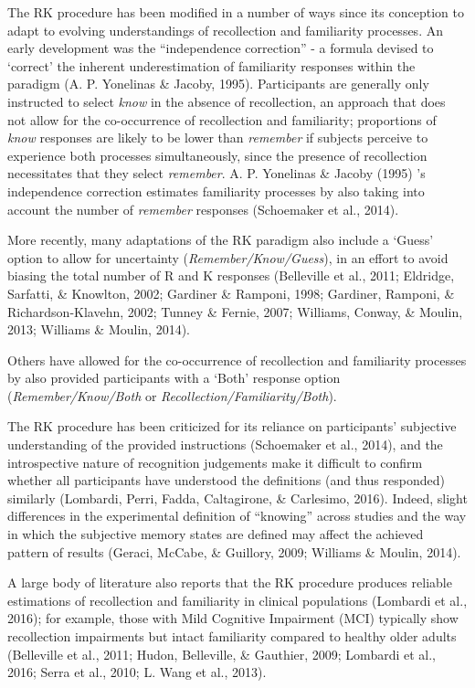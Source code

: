 \documentclass[
  11pt,
]{article}
\begin{document}
The RK procedure has been modified in a number of ways since its
conception to adapt to evolving understandings of recollection and
familiarity processes. An early development was the ``independence
correction'' - a formula devised to `correct' the inherent
underestimation of familiarity responses within the paradigm (A. P.
Yonelinas \& Jacoby, 1995). Participants are generally only instructed
to select \emph{know} in the absence of recollection, an approach that
does not allow for the co-occurrence of recollection and familiarity;
proportions of \emph{know} responses are likely to be lower than
\emph{remember} if subjects perceive to experience both processes
simultaneously, since the presence of recollection necessitates that
they select \emph{remember}. A. P. Yonelinas \& Jacoby (1995) 's
independence correction estimates familiarity processes by also taking
into account the number of \emph{remember} responses (Schoemaker et al.,
2014).

More recently, many adaptations of the RK paradigm also include a
`Guess' option to allow for uncertainty (\emph{Remember/Know/Guess}), in
an effort to avoid biasing the total number of R and K responses
(Belleville et al., 2011; Eldridge, Sarfatti, \& Knowlton, 2002;
Gardiner \& Ramponi, 1998; Gardiner, Ramponi, \& Richardson-Klavehn,
2002; Tunney \& Fernie, 2007; Williams, Conway, \& Moulin, 2013;
Williams \& Moulin, 2014).

Others have allowed for the co-occurrence of recollection and
familiarity processes by also provided participants with a `Both'
response option (\emph{Remember/Know/Both} or
\emph{Recollection/Familiarity/Both}).

The RK procedure has been criticized for its reliance on participants'
subjective understanding of the provided instructions (Schoemaker et
al., 2014), and the introspective nature of recognition judgements make
it difficult to confirm whether all participants have understood the
definitions (and thus responded) similarly (Lombardi, Perri, Fadda,
Caltagirone, \& Carlesimo, 2016). Indeed, slight differences in the
experimental definition of ``knowing'' across studies and the way in
which the subjective memory states are defined may affect the achieved
pattern of results (Geraci, McCabe, \& Guillory, 2009; Williams \&
Moulin, 2014).

A large body of literature also reports that the RK procedure produces
reliable estimations of recollection and familiarity in clinical
populations (Lombardi et al., 2016); for example, those with Mild
Cognitive Impairment (MCI) typically show recollection impairments but
intact familiarity compared to healthy older adults (Belleville et al.,
2011; Hudon, Belleville, \& Gauthier, 2009; Lombardi et al., 2016; Serra
et al., 2010; L. Wang et al., 2013).
\end{document}
